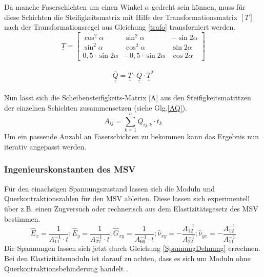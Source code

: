 \noindent
Da manche Faserschichten um einen Winkel $\alpha$ gedreht sein können, muss für diese Schichten die Steifigkeitsmatrix mit Hilfe der Transformationsmatrix $[T]$  nach der Transformationsregel aus Gleichung \ref{trafo} transforniert werden.
\begin{equation}
	\underline{\underline{T}}=
	\begin{bmatrix}
		\cos^{2}\alpha&\sin^{2}\alpha&-\sin 2\alpha\\
		\sin^{2}\alpha&\cos^{2}\alpha&\sin 2\alpha\\
		0,5\cdot \sin2\alpha&-0,5\cdot\sin2\alpha&\cos 2\alpha
	\end{bmatrix}
\end{equation}\\
\begin{equation}
\label{trafo}
	\overline{\underline{\underline{Q}}}=\underline{\underline{T}}\cdot \underline{\underline{Q}} \cdot \underline{\underline{T}}^{T}  
\end{equation}\\
\noindent
Nun lässt sich die Scheibensteifigkeits-Matrix [A] aus den Steifigkeitsmatritzen der einzelnen Schichten zusammensetzen (siehe Glg.\ref{AQ}).
\begin{equation}
\label{AQ}
	A_{ij}= \sum_{k=1}^{n} \overline{Q}_{ij,k}\cdot t_{k}
\end{equation}
\noindent
Um ein passende Anzahl an Faserschichten zu bekommen kann das Ergebnis nun iterativ angepasst werden.\cite{item3}
\subsubsection{Ingenieurskonstanten des MSV}
Für den einachsigen Spannungszustand lassen sich die Moduln und Querkontraktionszahlen für den MSV ableiten.
Diese lassen sich experimentell über z.B. einen Zugversuch oder rechnerisch aus dem Elastizitätsgesetz des MSV bestimmen.
\begin{equation}
\hat{E}_{x}=\frac{1}{A_{11}^{-1}\cdot t}
;
\hat{E}_{y}=\frac{1}{A_{22}^{-1}\cdot t}
;
\hat{G}_{xy}=\frac{1}{A_{66}^{-1}\cdot t}
;
\hat{\nu}_{xy}=-\frac{A_{12}^{-1}}{A_{22}^{-1}}
;
\hat{\nu}_{yx}=-\frac{A_{12}^{-1}}{A_{11}^{-1}}
\end{equation}
\noindent
Die Spannungen lassen sich jetzt durch Gleichung \ref{SpannungDehnung} errechnen.\\
\noindent
Bei den Elastizitätsmoduln ist darauf zu achten, dass es sich um Moduln ohne Querkontraktionsbehinderung handelt \cite{item3}.

